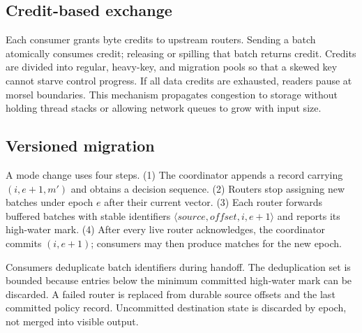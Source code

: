 \subsection{Credit-based exchange}

Each consumer grants byte credits to upstream routers.  Sending a batch
atomically consumes credit; releasing or spilling that batch returns credit.
Credits are divided into regular, heavy-key, and migration pools so that a
skewed key cannot starve control progress.  If all data credits are exhausted,
readers pause at morsel boundaries.  This mechanism propagates congestion to
storage without holding thread stacks or allowing network queues to grow with
input size.

\subsection{Versioned migration}
\label{sec:migration}

A mode change uses four steps.  (1) The coordinator appends a 
record carrying $(i,e+1,m')$ and obtains a decision sequence.  (2) Routers stop
assigning new batches under epoch $e$ after their current vector.  (3) Each
router forwards buffered batches with stable identifiers
$\langle\textit{source},\textit{offset},i,e+1\rangle$ and reports its high-water
mark.  (4) After every live router acknowledges, the coordinator commits
$(i,e+1)$; consumers may then produce matches for the new epoch.

Consumers deduplicate batch identifiers during handoff.  The deduplication set
is bounded because entries below the minimum committed high-water mark can be
discarded.  A failed router is replaced from durable source offsets and the
last committed policy record.  Uncommitted destination state is discarded by
epoch, not merged into visible output.
